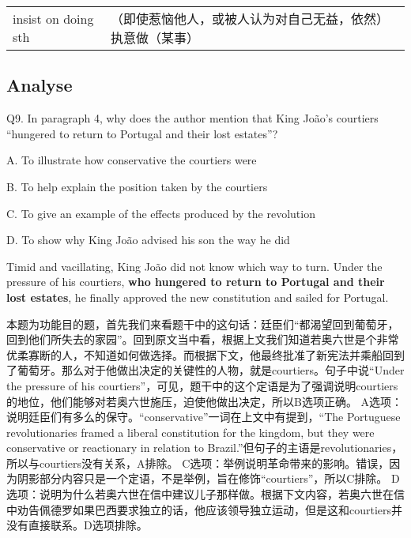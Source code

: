\begin{tabular}{ll}
    insist on doing sth & （即使惹恼他人，或被人认为对自己无益，依然）执意做（某事） \\
\end{tabular}

\subsection{Analyse}

\begin{blk}
    \begin{qst}
        Q9. In paragraph 4, why does the author mention that King João’s courtiers “hungered to return to Portugal and their lost estates”?
    \end{qst}

    \begin{chc}
        A. To illustrate how conservative the courtiers were

        B. To help explain the position taken by the courtiers

        C. To give an example of the effects produced by the revolution

        D. To show why King João advised his son the way he did
    \end{chc}

    \begin{psgq}
        Timid and vacillating, King João did not know which way to turn. Under the pressure of his courtiers, \textbf{who hungered to return to Portugal and their lost estates}, he finally approved the new constitution and sailed for Portugal.
    \end{psgq}

    \begin{nlz}
        本题为功能目的题，首先我们来看题干中的这句话：廷臣们“都渴望回到葡萄牙，回到他们所失去的家园”。回到原文当中看，根据上文我们知道若奥六世是个非常优柔寡断的人，不知道如何做选择。而根据下文，他最终批准了新宪法并乘船回到了葡萄牙。那么对于他做出决定的关键性的人物，就是courtiers。句子中说“Under the pressure of his courtiers”，可见，题干中的这个定语是为了强调说明courtiers的地位，他们能够对若奥六世施压，迫使他做出决定，所以B选项正确。 A选项：说明廷臣们有多么的保守。“conservative”一词在上文中有提到，“The Portuguese revolutionaries framed a liberal constitution for the kingdom, but they were conservative or reactionary in relation to Brazil.”但句子的主语是revolutionaries，所以与courtiers没有关系，A排除。 C选项：举例说明革命带来的影响。错误，因为阴影部分内容只是一个定语，不是举例，旨在修饰“courtiers”，所以C排除。 D选项：说明为什么若奥六世在信中建议儿子那样做。根据下文内容，若奥六世在信中劝告佩德罗如果巴西要求独立的话，他应该领导独立运动，但是这和courtiers并没有直接联系。D选项排除。
    \end{nlz}
\end{blk}

